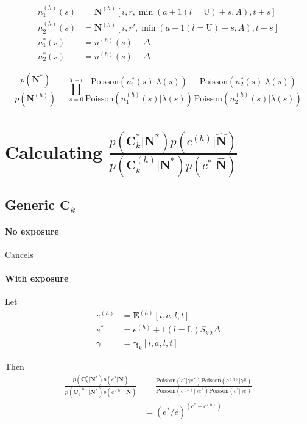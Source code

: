 \documentclass{article}
\begin{document}
\begin{align}
  n_1^{(h)}(s) & = \bm{N}^{(h)}[i, r, \min(a + 1(l = \text{U}) + s, A), t + s] \\
  n_2^{(h)}(s) & = \bm{N}^{(h)}[i, r', \min(a + 1(l = \text{U}) + s, A), t + s] \\
  n_1^*(s) & = n^{(h)}(s) + \Delta \\
  n_2^*(s) & = n^{(h)}(s) - \Delta
\end{align}

\begin{equation}
  \frac{p(\bm{N}^*)}{p(\bm{N}^{(h)})} = \prod_{s = 0}^{T-t} \frac{ \text{Poisson}\left( n_1^*(s) | \lambda(s) \right) }{ \text{Poisson}\left( n_1^{(h)}(s) | \lambda(s) \right) } \frac{ \text{Poisson} \left( n_2^*(s) | \lambda(s) \right) }{ \text{Poisson}\left( n_2^{(h)}(s) | \lambda(s) \right) }
\end{equation}




\section{Calculating $\frac{p(\bm{C}_k^* | \bm{N}^*) p(c^{(h)} | \hat{\bm{N}})  }{p(\bm{C}_k^{(h)} | \bm{N}^*) p(c^* | \hat{\bm{N}}) }$}


\subsection{Generic $\bm{C}_k$}

\paragraph{No exposure}

Cancels

\paragraph{With exposure}
 
Let
\begin{align}
  e^{(h)} & = \bm{E}^{(h)}[i, a, l, t] \\
  e^* & = e^{(h)} + 1(l = \text{L}) S_k \tfrac{1}{2} \Delta \\
  \gamma & = \bm{\gamma}_k[i, a, l, t]
\end{align}

Then
\begin{align}
\frac{p(\bm{C}_k^* | \bm{N}^*) p(c^* | \hat{\bm{N}})  }{p(\bm{C}_k^{(h)} | \bm{N}^*) p(c^{(h)} | \hat{\bm{N}}) } 
  & = \frac{ \text{Poisson}\left( c^* | \gamma e^* \right) \text{Poisson}\left( c^{(h)} | \gamma \hat{e} \right) }{ \text{Poisson}\left( c^{(h)} | \gamma e^* \right) \text{Poisson}\left( c^* | \gamma \hat{e} \right) } \\
  & = (e^* / \hat{e} )^{(c^* - c^{(h)})}
\end{align}
\end{document}
